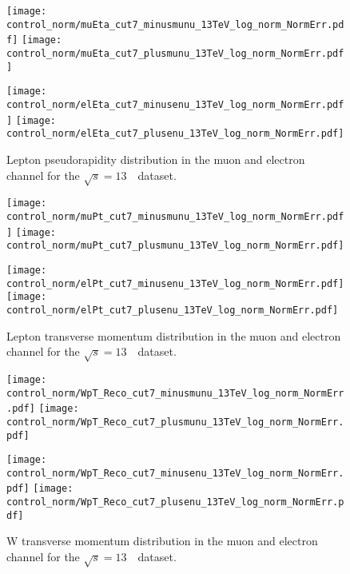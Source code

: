 \begin{figure}[h]
	\centering
	{\texttt{[image: control\_norm/muEta\_cut7\_minusmunu\_13TeV\_log\_norm\_NormErr.pdf]}\label{f:}}
	{\texttt{[image: control\_norm/muEta\_cut7\_plusmunu\_13TeV\_log\_norm\_NormErr.pdf]}\label{f:}}
	
	{\texttt{[image: control\_norm/elEta\_cut7\_minusenu\_13TeV\_log\_norm\_NormErr.pdf]}\label{f:}}
	{\texttt{[image: control\_norm/elEta\_cut7\_plusenu\_13TeV\_log\_norm\_NormErr.pdf]}\label{f:}}
	\caption{  Lepton pseudorapidity distribution in the muon and electron channel  for the $\sqrt{s} = 13$~\TeV\ dataset. }\end{figure}


\begin{figure}[h]
	\centering
	{\texttt{[image: control\_norm/muPt\_cut7\_minusmunu\_13TeV\_log\_norm\_NormErr.pdf]}\label{f:}}
	{\texttt{[image: control\_norm/muPt\_cut7\_plusmunu\_13TeV\_log\_norm\_NormErr.pdf]}\label{f:}}
	
	{\texttt{[image: control\_norm/elPt\_cut7\_minusenu\_13TeV\_log\_norm\_NormErr.pdf]}\label{f:}}
	{\texttt{[image: control\_norm/elPt\_cut7\_plusenu\_13TeV\_log\_norm\_NormErr.pdf]}\label{f:}}
	\caption{  Lepton transverse momentum distribution in the muon and electron channel  for the $\sqrt{s} = 13$~\TeV\ dataset. }\end{figure}



\begin{figure}[h]
	\centering
	{\texttt{[image: control\_norm/WpT\_Reco\_cut7\_minusmunu\_13TeV\_log\_norm\_NormErr.pdf]}\label{f:}}
	{\texttt{[image: control\_norm/WpT\_Reco\_cut7\_plusmunu\_13TeV\_log\_norm\_NormErr.pdf]}\label{f:}}
	
	{\texttt{[image: control\_norm/WpT\_Reco\_cut7\_minusenu\_13TeV\_log\_norm\_NormErr.pdf]}\label{f:}}
	{\texttt{[image: control\_norm/WpT\_Reco\_cut7\_plusenu\_13TeV\_log\_norm\_NormErr.pdf]}\label{f:}}
	\caption{  W transverse momentum distribution in the muon and electron channel  for the $\sqrt{s} = 13$~\TeV\ dataset. }\end{figure}


\clearpage


